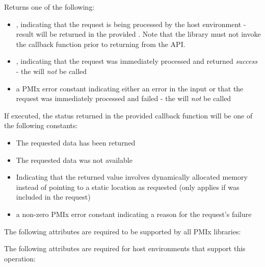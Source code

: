 Returns one of the following:

\begin{itemize}
    \item {}, indicating that the request is being processed by the host environment - result will be returned in the provided . Note that the library must not invoke the callback function prior to returning from the \ac{API}.
    \item {}, indicating that the request was immediately processed and returned \textit{success} - the  will \textit{not} be called
    \item a \ac{PMIx} error constant indicating either an error in the input or that the request was immediately processed and failed - the  will \textit{not} be called
\end{itemize}

If executed, the status returned in the provided callback function will be one of the following constants:

\begin{itemize}
\item {} The requested data has been returned
\item {} The requested data was not available
\item {} Indicating that the returned value
involves dynamically allocated memory instead of pointing to a static location
as requested  (only applies if  was included in the request)
\item a non-zero \ac{PMIx} error constant indicating a reason for the request's failure
\end{itemize}

\reqattrstart
The following attributes are required to be supported by all \ac{PMIx} libraries:


\divider

The following attributes are required for host environments that support this operation:

